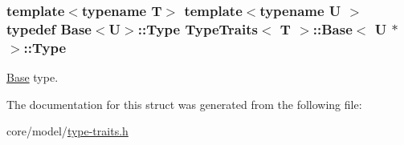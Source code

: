 \subsubsection[{\texorpdfstring{Type}{Type}}]{\setlength{\rightskip}{0pt plus 5cm}template$<$typename T$>$ template$<$typename U $>$ typedef {\bf Base}$<$U$>$\+::{\bf Type} {\bf Type\+Traits}$<$ T $>$\+::{\bf Base}$<$ U $\ast$ $>$\+::{\bf Type}}\hypertarget{structTypeTraits_1_1Base_3_01U_01_5_01_4_a93f6a7c331938348b7ea3fa82de9a0b6}{}\label{structTypeTraits_1_1Base_3_01U_01_5_01_4_a93f6a7c331938348b7ea3fa82de9a0b6}
\hyperlink{structTypeTraits_1_1Base}{Base} type. 

The documentation for this struct was generated from the following file\+:\begin{DoxyCompactItemize}
\item 
core/model/\hyperlink{type-traits_8h}{type-\/traits.\+h}\end{DoxyCompactItemize}
